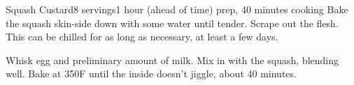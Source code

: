 \documentclass[../Cookbook.tex]{subfiles}
\begin{document}
\begin{recipe}[SquashCustard]{Squash Custard}{8 servings}{1 hour (ahead of time) prep, 40 minutes cooking}
	Bake the squash skin-side down with some water until tender.
	Scrape out the flesh. This can be chilled for as long as necessary, at least a few days.

	Whisk egg and preliminary amount of milk.
	Mix in with the squash, blending well.
	Bake at 350\0F until the inside doesn't jiggle, about 40%
	minutes.
\end{recipe}
\end{document}
